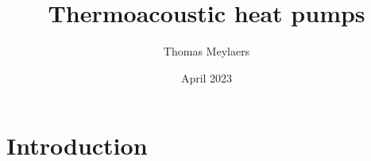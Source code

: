 \documentclass{article}
\title{Thermoacoustic heat pumps}
\author{Thomas Meylaers}
\date{April 2023}
\begin{document}
\maketitle

\newpage

\tableofcontents

\newpage

\section{Introduction}
\end{document}
